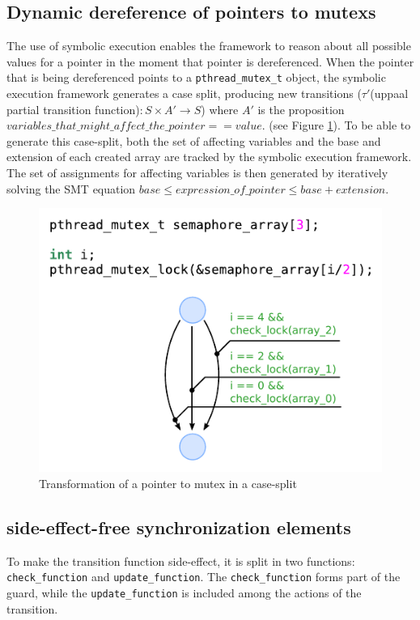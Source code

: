 \documentclass[conference]{IEEEtran}
\begin{document}
\subsection{Dynamic dereference of pointers to mutexs}

The use of symbolic execution enables the framework to reason about all possible values for a pointer in the moment that pointer is dereferenced. When the pointer that is being dereferenced points to a \verb+pthread_mutex_t+ object, the symbolic execution framework generates a case split, producing new transitions ($\tau'$(uppaal partial transition function)$: S \times A' \rightarrow S$) where $A'$ is the proposition $variables\_that\_might\_affect\_the\_pointer == value$. (see Figure \ref{fig:case_split}). To be able to generate this case-split, both the set of affecting variables and the base and extension of each created array are tracked by the symbolic execution framework. The set of assignments for affecting variables is then generated by iteratively solving the SMT equation $base \leq expression\_of\_pointer \leq base + extension$.


\begin{figure}
\centering
\includegraphics[width=0.75\columnwidth]{media/case_split.pdf}
\caption{Transformation of a pointer to mutex in a case-split}
\label{fig:case_split}
\end{figure}

\subsection{side-effect-free synchronization elements}

To make the transition function side-effect, it is split in two functions: \verb+check_function+ and \verb+update_function+. The \verb+check_function+ forms part of the guard, while the \verb+update_function+ is included among the actions of the transition.
\end{document}
